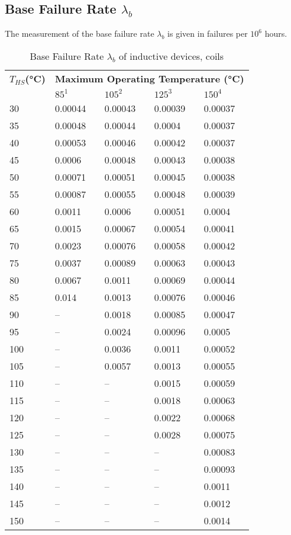 \subsection{Base Failure Rate $\lambda_b$}
The measurement of the base failure rate $\lambda_b$ is given in failures per $10^6$ hours.
\begin{table}[ht]
{\centering

\begin{tabular}{|p{1.3cm}|*{4}{p{1.2cm}|}}
    \hline
    \textbf{$T_{HS}$(°C)} & \multicolumn{4}{c|}{\textbf{Maximum Operating Temperature (°C)}} \\
    & $85^1$ & $105^2$ & $125^3$ & $150^4$ \\
    \hline
    30 & 0.00044 & 0.00043 & 0.00039 & 0.00037 \\
    \hline
    35 & 0.00048 & 0.00044 & 0.0004 & 0.00037 \\
    \hline
    40 & 0.00053 & 0.00046 & 0.00042 & 0.00037 \\
    \hline
    45 & 0.0006 & 0.00048 & 0.00043 & 0.00038 \\
    \hline
    50 & 0.00071 & 0.00051 & 0.00045 & 0.00038 \\
    \hline
    55 & 0.00087 & 0.00055 & 0.00048 & 0.00039 \\
    \hline
    60 & 0.0011 & 0.0006 & 0.00051 & 0.0004 \\
    \hline
    65 & 0.0015 & 0.00067 & 0.00054 & 0.00041 \\
    \hline
    70 & 0.0023 & 0.00076 & 0.00058 & 0.00042 \\
    \hline
    75 & 0.0037 & 0.00089 & 0.00063 & 0.00043 \\
    \hline
    80 & 0.0067 & 0.0011 & 0.00069 & 0.00044 \\
    \hline
    85 & 0.014 & 0.0013 & 0.00076 & 0.00046 \\
    \hline
    90 & -- & 0.0018 & 0.00085 & 0.00047 \\
    \hline
    95 & -- & 0.0024 & 0.00096 & 0.0005 \\
    \hline
    100 & -- & 0.0036 & 0.0011 & 0.00052 \\
    \hline
    105 & -- & 0.0057 & 0.0013 & 0.00055 \\
    \hline
    110 & -- & -- & 0.0015 & 0.00059 \\
    \hline
    115 & -- & -- & 0.0018 & 0.00063 \\
    \hline
    120 & -- & -- & 0.0022 & 0.00068 \\
    \hline
    125 & -- & -- & 0.0028 & 0.00075 \\
    \hline
    130 & -- & -- & -- & 0.00083 \\
    \hline
    135 & -- & -- & -- & 0.00093 \\
    \hline
    140 & -- & -- & -- & 0.0011 \\
    \hline
    145 & -- & -- & -- & 0.0012 \\
    \hline
    150 & -- & -- & -- & 0.0014 \\
    \hline
\end{tabular}
\caption{Base Failure Rate $\lambda_b$ of inductive devices, coils}
\label{tab:bfr_inductive_devices_coils}
\par}

\end{table}

